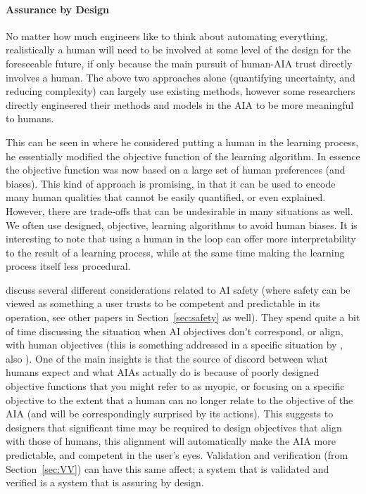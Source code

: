     \paragraph{Assurance by Design} No matter how much engineers like to think about automating everything, realistically a human will need to be involved at some level of the design for the foreseeable future, if only because the main pursuit of human-AIA trust directly involves a human. The above two approaches alone (quantifying uncertainty, and reducing complexity) can largely use existing methods, however some researchers directly engineered their methods and models in the AIA to be more meaningful to humans.

    This can be seen in \citet{Freitas2006-qo} where he considered putting a human in the learning process, he essentially modified the objective function of the learning algorithm. In essence the objective function was now based on a large set of human preferences (and biases). This kind of approach is promising, in that it can be used to encode many human qualities that cannot be easily quantified, or even explained. However, there are trade-offs that can be undesirable in many situations as well. We often use designed, objective, learning algorithms to avoid human biases. It is interesting to note that using a human in the loop can offer more interpretability to the result of a learning process, while at the same time making the learning process itself less procedural.

    \citet{Amodei2016-xi} discuss several different considerations related to AI safety (where safety can be viewed as something a user trusts to be competent and predictable in its operation, see other papers in Section~\ref{sec:safety} as well). They spend quite a bit of time discussing the situation when AI objectives don't correspond, or align, with human objectives (this is something addressed in a specific situation by \cite{Hadfield-Menell2016-ws}, also \cite{Bostrom2012-uf}). One of the main insights is that the source of discord between what humans expect and what AIAs actually do is because of poorly designed objective functions that you might refer to as myopic, or focusing on a specific objective to the extent that a human can no longer relate to the objective of the AIA (and will be correspondingly surprised by its actions). This suggests to designers that significant time may be required to design objectives that align with those of humans, this alignment will automatically make the AIA more predictable, and competent in the user's eyes. Validation and verification (from Section~\ref{sec:VV}) can have this same affect; a system that is validated and verified is a system that is assuring by design.

